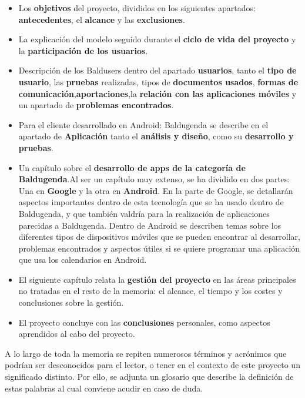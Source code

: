 \begin{itemize}
	\item Los \textbf{objetivos} del proyecto, divididos en los siguientes apartados: \textbf{antecedentes}, el \textbf{alcance} y las \textbf{exclusiones}.
	\item La explicación del modelo seguido durante el \textbf{ciclo de vida del proyecto} y la \textbf{participación de los usuarios}.
	\item Descripción de los Baldusers dentro del apartado \textbf{usuarios}, tanto el \textbf{tipo de usuario}, las \textbf{pruebas} realizadas, tipos de \textbf{documentos usados}, \textbf{formas de comunicación},\textbf{aportaciones},la \textbf{relación con las aplicaciones móviles} y un apartado de \textbf{problemas encontrados}.
	\item Para el cliente desarrollado en Android: Baldugenda se describe en el apartado de \textbf{Aplicación} tanto el \textbf{análisis y diseño}, como su \textbf{desarrollo y pruebas}.
	\item Un capítulo sobre el \textbf{desarrollo de apps de la categoría de Baldugenda}.Al ser un capítulo muy extenso, se ha dividido en dos partes: Una en \textbf{Google} y la otra en \textbf{Android}. En la parte de Google, se detallarán aspectos importantes dentro de esta tecnología que se ha usado dentro de Baldugenda, y que también valdría para la realización de aplicaciones parecidas a Baldugenda. Dentro de Android se describen temas sobre los diferentes tipos de dispositivos móviles que se pueden encontrar al desarrollar, problemas encontrados y aspectos útiles si se quiere programar una aplicación que usa los calendarios en Android.
	\item El siguiente capítulo relata la \textbf{gestión del proyecto} en las áreas principales no tratadas en el resto de la memoria: el alcance, el tiempo y los costes y conclusiones sobre la gestión.
	\item El proyecto concluye con las \textbf{conclusiones} personales, como aspectos aprendidos al cabo del proyecto.
\end{itemize}

A lo largo de toda la memoria se repiten numerosos términos y acrónimos que podrían
ser desconocidos para el lector, o tener en el contexto de este proyecto un significado distinto. Por ello, se adjunta un glosario que describe la definición de estas palabras al cual conviene acudir en caso de duda.







































